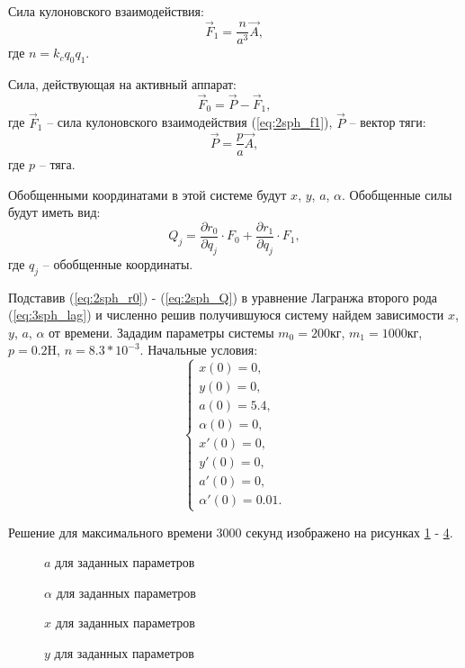 Сила кулоновского взаимодействия:
\begin{equation}
\label{eq:2sph_f1}
	\vec{F}_1 = \frac{n}{a^3}\vec{A},
\end{equation}
где $n = k_c q_0 q_1$.

Сила, действующая на активный аппарат:
\begin{equation}
\label{eq:2sph_f0}
	\vec{F}_0 = \vec{P} - \vec{F}_1,
\end{equation}
где $\vec{F}_1$ – сила кулоновского взаимодействия (\ref{eq:2sph_f1}), $\vec{P}$ – вектор тяги:
\begin{equation}
\label{eq:2sph_P}
	\vec{P} = \frac{p}{a} \vec{A},
\end{equation}
где $p$ – тяга.

Обобщенными координатами в этой системе будут $x$, $y$, $a$, $\alpha$.
Обобщенные силы будут иметь вид:
\begin{equation}
\label{eq:2sph_Q}
	Q_j = \frac{\partial r_0}{\partial q_j} \cdot F_0 + \frac{\partial r_1}{\partial q_j} \cdot F_1,
\end{equation}
где $q_j$ – обобщенные координаты.

Подставив (\ref{eq:2sph_r0}) - (\ref{eq:2sph_Q}) в уравнение Лагранжа второго рода (\ref{eq:3sph_lag}) и численно решив получившуюся систему найдем зависимости $x$, $y$, $a$, $\alpha$ от времени.
Зададим параметры системы $m_0 = 200$кг, $m_1=1000$кг, $p=0.2$H, $n=8.3 * 10^{-3}$.
Начальные условия:
\begin{equation}
	\begin{cases}
		x(0) = 0, \\
		y(0) = 0, \\
		a(0) = 5.4, \\
		\alpha(0) = 0,\\
		x'(0) = 0, \\
		y'(0) = 0, \\
		a'(0) = 0, \\
		\alpha'(0) = 0.01.
	\end{cases}
\end{equation}

Решение для максимального времени $3000$ секунд изображено на рисунках \ref{ris:2sph_a_no_u} - \ref{ris:2sph_y_no_u}.

\begin{figure}[H]
	\caption{$a$ для заданных параметров}
	\label{ris:2sph_a_no_u}
\end{figure}
\begin{figure}[H]
	\caption{$\alpha$ для заданных параметров}
	\label{ris:2sph_alpha_no_u}
\end{figure} 
\begin{figure}[H]
	\caption{$x$ для заданных параметров}
	\label{ris:2sph_x_no_u}
\end{figure} 
\begin{figure}[H]
	\caption{$y$ для заданных параметров}
	\label{ris:2sph_y_no_u}
\end{figure} 

